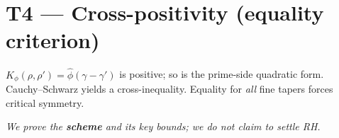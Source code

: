 \documentclass[11pt,a4paper]{proofarticle}
\begin{document}
\section*{T4 — Cross-positivity (equality criterion)}
$K_\phi(\rho,\rho')=\widehat\phi(\gamma-\gamma')$ is positive; so is the prime-side quadratic form.
Cauchy–Schwarz yields a cross-inequality. Equality for \emph{all} fine tapers forces critical symmetry.

\bigskip
\noindent\emph{We prove the \textbf{scheme} and its key bounds; we do not claim to settle RH.}
\end{document}
